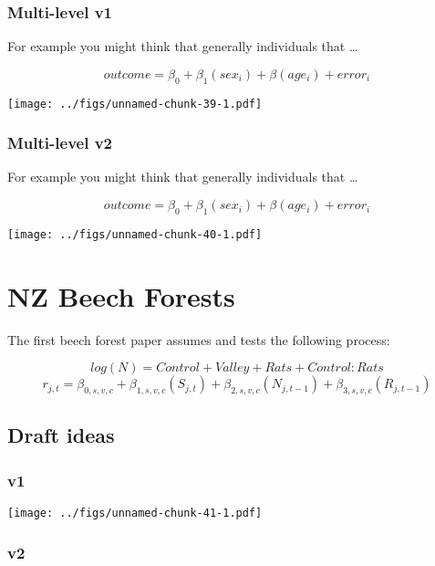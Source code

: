 \documentclass[]{book}
\begin{document}
\hypertarget{multi-level-v1}{%
\subsection{Multi-level v1}\label{multi-level-v1}}

For example you might think that generally individuals that \ldots{}

\[ outcome = \beta_0 + \beta_1(sex_i) + \beta(age_i) + error_i \]

\texttt{[image: ../figs/unnamed-chunk-39-1.pdf]}

\hypertarget{multi-level-v2}{%
\subsection{Multi-level v2}\label{multi-level-v2}}

For example you might think that generally individuals that \ldots{}

\[ outcome = \beta_0 + \beta_1(sex_i) + \beta(age_i) + error_i \]

\texttt{[image: ../figs/unnamed-chunk-40-1.pdf]}

\hypertarget{nzbs}{%
\chapter{NZ Beech Forests}\label{nzbs}}

The first beech forest paper assumes and tests the following process:

\[log(N) = Control + Valley + Rats + Control:Rats\]
\[r_{j,t} = \beta_{0,s,v,c} + \beta_{1,s,v,c} (S_{j,t})+ \beta_{2,s,v,c} (N_{j,t-1}) + \beta_{3,s,v,c} (R_{j,t-1})\]

\hypertarget{draft-ideas}{%
\section{Draft ideas}\label{draft-ideas}}

\hypertarget{v1-2}{%
\subsection{v1}\label{v1-2}}

\texttt{[image: ../figs/unnamed-chunk-41-1.pdf]}

\hypertarget{v2-2}{%
\subsection{v2}\label{v2-2}}
\end{document}
